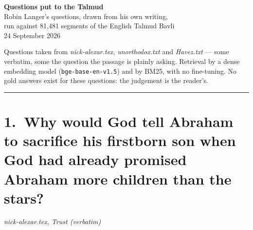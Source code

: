 \documentclass[11pt,a4paper]{article}
\begin{document}
\begin{center}
{\LARGE\bfseries Questions put to the Talmud}\\[6pt]
{\color{quiet}\normalsize Robin Langer's questions, drawn from his own writing,\\
run against 81,481 segments of the English Talmud Bavli}\\[4pt]
{\color{quiet}\small 24 September 2026}
\end{center}
\vspace{10pt}
{\color{quiet}\small Questions taken from \textit{nick-alexar.tex}, \textit{unorthodox.txt} and
\textit{Havez.txt} --- some verbatim, some the question the passage is plainly asking.
Retrieval by a dense embedding model (\texttt{bge-base-en-v1.5}) and by BM25, with no
fine-tuning. No gold answers exist for these questions: the judgement is the reader's.}
\vspace{6pt}\hrule\vspace{4pt}
\section*{1.\ Why would God tell Abraham to sacrifice his firstborn son when God had already promised Abraham more children than the stars?}
{\color{quiet}\small\textit{nick-alexar.tex, Trust (verbatim)}}
\end{document}
